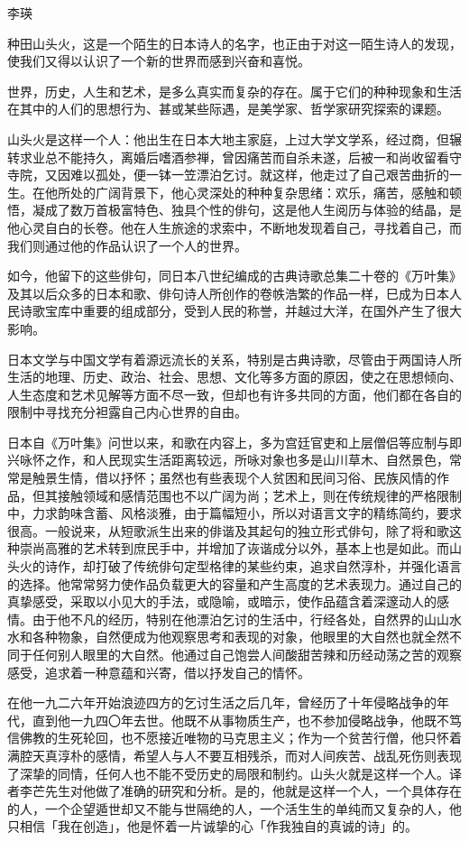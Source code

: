  {\FS \hfill 李瑛

  种田山头火，这是一个陌生的日本诗人的名字，也正由于对这一陌生诗人的发现，使我们又得以认识了一个新的世界而感到兴奋和喜悦。

  世界，历史，人生和艺术，是多么真实而复杂的存在。属于它们的种种现象和生活在其中的人们的思想行为、甚或某些际遇，是美学家、哲学家研究探索的课题。

  山头火是这样一个人：他出生在日本大地主家庭，上过大学文学系，经过商，但辗转求业总不能持久，离婚后嗜酒参禅，曾因痛苦而自杀未遂，后被一和尚收留看守寺院，又因难以孤处，便一钵一笠漂泊乞讨。就这样，他走过了自己艰苦曲折的一生。在他所处的广阔背景下，他心灵深处的种种复杂思绪：欢乐，痛苦，感触和顿悟，凝成了数万首极富特色、独具个性的俳句，这是他人生阅历与体验的结晶，是他心灵自白的长卷。他在人生旅途的求索中，不断地发现着自己，寻找着自己，而我们则通过他的作品认识了一个人的世界。

  如今，他留下的这些俳句，同日本八世纪编成的古典诗歌总集二十卷的《万叶集》及其以后众多的日本和歌、俳句诗人所创作的卷帙浩繁的作品一样，巳成为日本人民诗歌宝库中重要的组成部分，受到人民的称誉，并越过大洋，在国外产生了很大影响。

  日本文学与中国文学有着源远流长的关系，特别是古典诗歌，尽管由于两国诗人所生活的地理、历史、政治、社会、思想、文化等多方面的原因，使之在思想倾向、人生态度和艺术见解等方面不尽一致，但却也有许多共同的方面，他们都在各自的限制中寻找充分袒露自己内心世界的自由。

  日本自《万叶集》问世以来，和歌在内容上，多为宫廷官吏和上层僧侣等应制与即兴咏怀之作，和人民现实生活距离较远，所咏对象也多是山川草木、自然景色，常常是触景生情，借以抒怀；虽然也有些表现个人贫困和民间习俗、民族风情的作品，但其接触领域和感情范围也不以广阔为尚；艺术上，则在传统规律的严格限制中，力求韵味含蓄、风格淡雅，由于篇幅短小，所以对语言文字的精练简约，要求很高。一般说来，从短歌派生出来的俳谐及其起句的独立形式俳句，除了将和歌这种崇尚高雅的艺术转到庶民手中，并增加了诙谐成分以外，基本上也是如此。而山头火的诗作，却打破了传统俳句定型格律的某些约束，追求自然淳朴，并强化语言的选择。他常常努力使作品负载更大的容量和产生高度的艺术表现力。通过自己的真挚感受，采取以小见大的手法，或隐喻，或暗示，使作品蕴含着深邃动人的感情。由于他不凡的经历，特别在他漂泊乞讨的生活中，行经各处，自然界的山山水水和各种物象，自然便成为他观察思考和表现的对象，他眼里的大自然也就全然不同于任何别人眼里的大自然。他通过自己饱尝人间酸甜苦辣和历经动荡之苦的观察感受，追求着一种意蕴和兴寄，借以抒发自己的情怀。

  在他一九二六年开始浪迹四方的乞讨生活之后几年，曾经历了十年侵略战争的年代，直到他一九四〇年去世。他既不从事物质生产，也不参加侵略战争，他既不笃信佛教的生死轮回，也不愿接近唯物的马克思主义；作为一个贫苦行僧，他只怀着满腔天真淳朴的感情，希望人与人不要互相残杀，而对人间疾苦、战乱死伤则表现了深挚的同情，任何人也不能不受历史的局限和制约。山头火就是这样一个人。译者李芒先生对他做了准确的研究和分析。是的，他就是这样一个人，一个具体存在的人，一个企望遁世却又不能与世隔绝的人，一个活生生的单纯而又复杂的人，他只相信「我在创造」，他是怀着一片诚挚的心「作我独自的真诚的诗」的。

}
